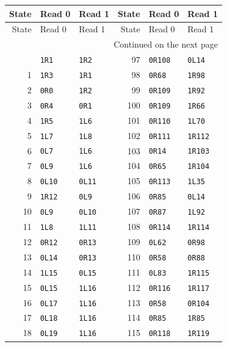 \begingroup
\small
\setlength{\tabcolsep}{12pt}
\begin{longtable}{rllrll}
\toprule State & Read 0 & Read 1 & State & Read 0 & Read 1 \\
\midrule\endfirsthead
\toprule State & Read 0 & Read 1 & State & Read 0 & Read 1 \\
\midrule\endhead
\midrule\multicolumn{6}{r}{Continued on the next page}\\\endfoot
\bottomrule\endlastfoot
0 & \texttt{1R1} & \texttt{1R2} & 97 & \texttt{0R108} & \texttt{0L14} \\
1 & \texttt{1R3} & \texttt{1R1} & 98 & \texttt{0R68} & \texttt{1R98} \\
2 & \texttt{0R0} & \texttt{1R2} & 99 & \texttt{0R109} & \texttt{1R92} \\
3 & \texttt{0R4} & \texttt{0R1} & 100 & \texttt{0R109} & \texttt{1R66} \\
4 & \texttt{1R5} & \texttt{1L6} & 101 & \texttt{0R110} & \texttt{1L70} \\
5 & \texttt{1L7} & \texttt{1L8} & 102 & \texttt{0R111} & \texttt{1R112} \\
6 & \texttt{0L7} & \texttt{1L6} & 103 & \texttt{0R14} & \texttt{1R103} \\
7 & \texttt{0L9} & \texttt{1L6} & 104 & \texttt{0R65} & \texttt{1R104} \\
8 & \texttt{0L10} & \texttt{0L11} & 105 & \texttt{0R113} & \texttt{1L35} \\
9 & \texttt{1R12} & \texttt{0L9} & 106 & \texttt{0R85} & \texttt{0L14} \\
10 & \texttt{0L9} & \texttt{0L10} & 107 & \texttt{0R87} & \texttt{1L92} \\
11 & \texttt{1L8} & \texttt{1L11} & 108 & \texttt{0R114} & \texttt{1R114} \\
12 & \texttt{0R12} & \texttt{0R13} & 109 & \texttt{0L62} & \texttt{0R98} \\
13 & \texttt{0L14} & \texttt{0R13} & 110 & \texttt{0R58} & \texttt{0R88} \\
14 & \texttt{1L15} & \texttt{0L15} & 111 & \texttt{0L83} & \texttt{1R115} \\
15 & \texttt{0L15} & \texttt{1L16} & 112 & \texttt{0R116} & \texttt{1R117} \\
16 & \texttt{0L17} & \texttt{1L16} & 113 & \texttt{0R58} & \texttt{0R104} \\
17 & \texttt{0L18} & \texttt{1L16} & 114 & \texttt{0R85} & \texttt{1R85} \\
18 & \texttt{0L19} & \texttt{1L16} & 115 & \texttt{0R118} & \texttt{1R119} \\

\end{longtable}
